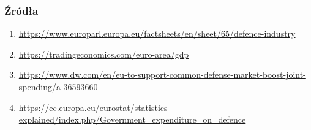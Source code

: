 \documentclass[aspectratio=169]{beamer}
\begin{document}
\begin{frame}
    \frametitle{Źródła}

    \begin{small}
    \begin{enumerate}
        \item \url{https://www.europarl.europa.eu/factsheets/en/sheet/65/defence-industry}
        \item \url{https://tradingeconomics.com/euro-area/gdp}
        \item \url{https://www.dw.com/en/eu-to-support-common-defense-market-boost-joint-spending/a-36593660}
        \item
            \url{https://ec.europa.eu/eurostat/statistics-explained/index.php/Government_expenditure_on_defence}
    \end{enumerate}
    \end{small}
\end{frame}
\end{document}
